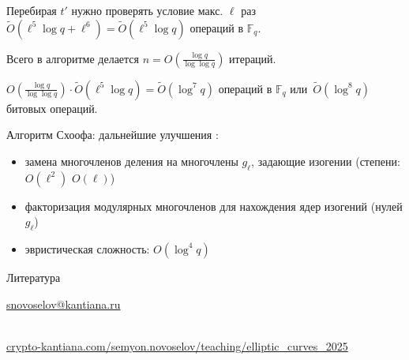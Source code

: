 \documentclass{beamer}
\begin{document}
\begin{frame}
Перебирая $t'$ нужно проверять условие макс. $\ell$ раз
\MyImplies
$\widetilde{O}(\ell^5 \log{q} + \ell^6) = \widetilde{O}(\ell^5 \log{q})$ операций в $\mathbb{F}_q$.

\vspace{1em}
Всего в алгоритме делается $n = O(\frac{\log{q}}{\log{\log{q}}})$ итераций.

\vspace{1em}
$O(\frac{\log{q}}{\log{\log{q}}}) \cdot \widetilde{O}(\ell^5 \log{q}) = \widetilde{O}(\log^7{q})$ операций в $\mathbb{F}_q$ или~$\widetilde{O}(\log^8{q})$ битовых операций.

\end{frame}

\begin{frame}{Алгоритм Схоофа: дальнейшие улучшения}
    :
    \begin{itemize}
        \item замена многочленов деления на многочлены $g_\ell$, задающие изогении (степени: $O(\ell^2)$ \structure{$\implies$} $O(\ell)$)
        \item факторизация модулярных многочленов для нахождения ядер изогений (нулей $g_\ell$)
        \item эвристическая сложность: $O(\log^4{q})$
    \end{itemize}
\end{frame}

\begin{frame}{Литература}
    \nocite{Blake1999}
    \nocite{Schoof1985}
    \nocite{CohenFrey+2005}
    \nocite{Washington2008}
    \printbibliography

    \begin{center}
        \begin{tcolorbox}[enhanced,hbox,colback=block-green-color-bg,colframe=subsection-color!120,title=Контакты,center title]
            \begin{varwidth}{\textwidth}
                \begin{center}
                    \href{mailto:snovoselov@kantiana.ru}{snovoselov@kantiana.ru}
                \end{center}
            \end{varwidth}
        \end{tcolorbox}	
    \end{center}
    
    \\
    {\footnotesize
    	\href{https://crypto-kantiana.com/semyon.novoselov/teaching/elliptic_curves_2025}{crypto-kantiana.com/semyon.novoselov/teaching/elliptic\_curves\_2025}
    }
\end{frame}
\end{document}
